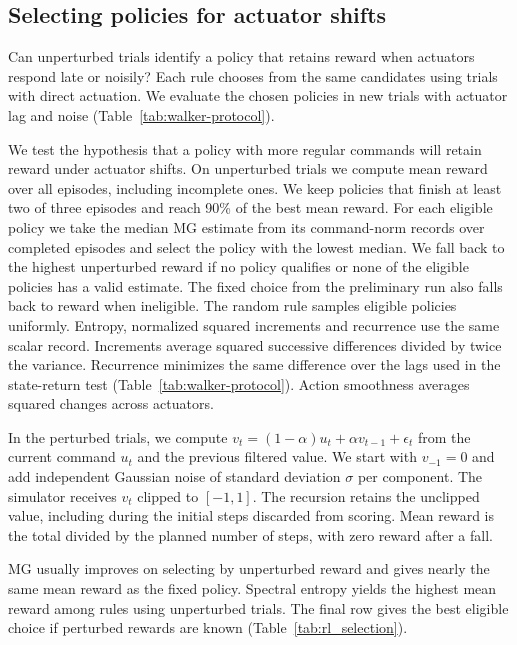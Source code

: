 {\subsection{Selecting policies for actuator shifts}\label{app:rl_selection}
Can unperturbed trials identify a policy that retains reward when actuators respond late or noisily? Each rule chooses from the same candidates using trials with direct actuation. We evaluate the chosen policies in new trials with actuator lag and noise (Table~\ref{tab:walker-protocol}).

We test the hypothesis that a policy with more regular commands will retain reward under actuator shifts. On unperturbed trials we compute mean reward over all episodes, including incomplete ones. We keep policies that finish at least two of three episodes and reach 90\% of the best mean reward. For each eligible policy we take the median MG estimate from its command-norm records over completed episodes and select the policy with the lowest median. We fall back to the highest unperturbed reward if no policy qualifies or none of the eligible policies has a valid estimate. The fixed choice from the preliminary run also falls back to reward when ineligible. The random rule samples eligible policies uniformly. Entropy, normalized squared increments and recurrence use the same scalar record. Increments average squared successive differences divided by twice the variance. Recurrence minimizes the same difference over the lags used in the state-return test (Table~\ref{tab:walker-protocol}). Action smoothness averages squared changes across actuators.

In the perturbed trials, we compute $v_t=(1-\alpha)u_t+\alpha v_{t-1}+\epsilon_t$ from the current command $u_t$ and the previous filtered value. We start with $v_{-1}=0$ and add independent Gaussian noise of standard deviation $\sigma$ per component. The simulator receives $v_t$ clipped to $[-1,1]$. The recursion retains the unclipped value, including during the initial steps discarded from scoring. Mean reward is the total divided by the planned number of steps, with zero reward after a fall.

\begin{table}[ht]
\centering\small
\caption{Walker2d reward and completion under actuator delay and noise.}
\label{tab:rl_selection}

\end{table}

MG usually improves on selecting by unperturbed reward and gives nearly the same mean reward as the fixed policy. Spectral entropy yields the highest mean reward among rules using unperturbed trials. The final row gives the best eligible choice if perturbed rewards are known (Table~\ref{tab:rl_selection}).

}
